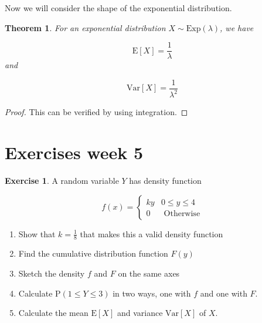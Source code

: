 \documentclass[
]{book}
\newtheorem{theorem}{Theorem}[chapter]
\theoremstyle{definition}
\theoremstyle{definition}
\theoremstyle{definition}
\newtheorem{exercise}{Exercise}[chapter]
\theoremstyle{definition}
\theoremstyle{remark}
\begin{document}
Now we will consider the shape of the exponential distribution.

\begin{theorem}
For an exponential distribution \(X\sim \text{Exp}(\lambda)\), we have

\[\text{E}[X] = \frac{1}{\lambda}\]
and

\[\text{Var}[X] = \frac{1}{\lambda ^2}\]
\end{theorem}

\begin{proof}
This can be verified by using integration.
\end{proof}

\hypertarget{exercises-week-5}{%
\section{Exercises week 5}\label{exercises-week-5}}

\begin{exercise}

A random variable \(Y\) has density function

\begin{equation*}
  f(x)=\begin{cases}
        ky & 0 \leq y \leq 4 \\
        0 &  \text{     Otherwise}
  \end{cases}
\end{equation*}

\begin{enumerate}
\def\labelenumi{\alph{enumi})}
\item
  Show that \(k = \frac{1}{8}\) that makes this a valid density function
\item
  Find the cumulative distribution function \(F(y)\)
\item
  Sketch the density \(f\) and \(F\) on the same axes
\item
  Calculate \(\text{P}(1\leq Y \leq 3)\) in two ways, one with \(f\) and one with \(F\).
\item
  Calculate the mean \(\text{E}[X]\) and variance \(\text{Var}[X]\) of \(X\).
\end{enumerate}

\end{exercise}
\end{document}
